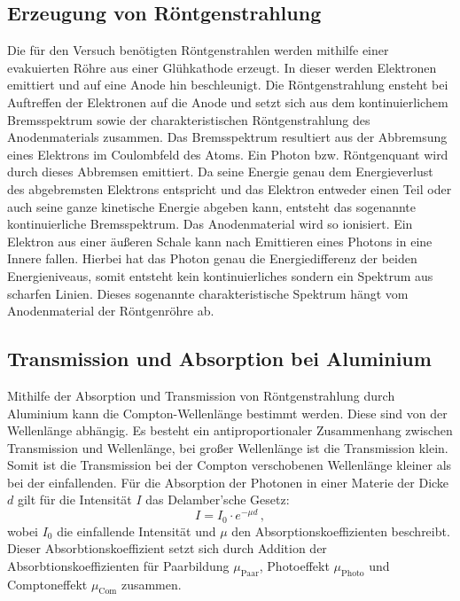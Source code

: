 \subsection{Erzeugung von Röntgenstrahlung}
\noindent
Die für den Versuch benötigten Röntgenstrahlen werden mithilfe einer evakuierten Röhre aus einer Glühkathode erzeugt.
In dieser werden  Elektronen emittiert und auf eine Anode hin beschleunigt.
Die Röntgenstrahlung ensteht bei Auftreffen der Elektronen auf die Anode und setzt sich aus dem kontinuierlichem Bremsspektrum sowie der charakteristischen Röntgenstrahlung des Anodenmaterials zusammen.
Das Bremsspektrum resultiert aus der Abbremsung eines Elektrons im Coulombfeld des Atoms.
Ein Photon bzw. Röntgenquant wird durch dieses Abbremsen emittiert.
Da seine Energie genau dem Energieverlust des abgebremsten Elektrons entspricht und das Elektron entweder einen Teil oder auch seine ganze kinetische Energie abgeben kann, entsteht das sogenannte kontinuierliche Bremsspektrum.
\noindent
Das Anodenmaterial wird so ionisiert.
Ein Elektron aus einer äußeren Schale kann nach Emittieren eines Photons in eine Innere fallen.
Hierbei hat das Photon genau die Energiedifferenz der beiden Energieniveaus, somit entsteht kein kontinuierliches sondern ein Spektrum aus scharfen Linien.
Dieses sogenannte charakteristische Spektrum hängt vom Anodenmaterial der Röntgenröhre ab.


\subsection{Transmission und Absorption bei Aluminium}
\noindent
Mithilfe der Absorption und Transmission von Röntgenstrahlung durch Aluminium kann die Compton-Wellenlänge bestimmt werden.
Diese sind von der Wellenlänge abhängig.
Es besteht ein antiproportionaler Zusammenhang zwischen Transmission und Wellenlänge, bei großer Wellenlänge ist die Transmission klein.
Somit ist die Transmission bei der Compton verschobenen Wellenlänge kleiner als bei der einfallenden.
Für die Absorption der Photonen in einer Materie der Dicke $d$ gilt für die Intensität $I$ das Delamber'sche Gesetz:
\begin{equation*}
    I = I_0 \cdot e^{-\mu d} \, ,
\end{equation*}
wobei $I_0$ die einfallende Intensität und $\mu$ den Absorptionskoeffizienten beschreibt.
Dieser Absorbtionskoeffizient setzt sich durch Addition der Absorbtionskoeffizienten für Paarbildung $\mu_\text{Paar}$, Photoeffekt $\mu_\text{Photo}$ und Comptoneffekt $\mu_\text{Com}$ zusammen.

